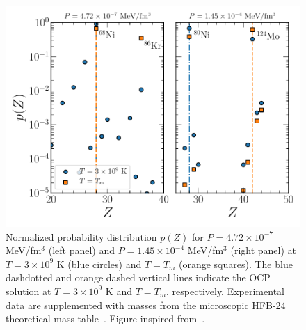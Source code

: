 \begin{figure}[!t]
  \begin{center}
    \includegraphics[width=0.9\linewidth]{figures/pj_ocrust.pdf}
  \end{center}
  \caption[Normalized probability distribution of the atomic number $Z$ for
  different thermodynamic conditions]{Normalized probability distribution 
    $p(Z)$ for $P=4.72\times 10^{-7}$ MeV/fm$^3$ (left panel) and $P=1.45\times 
    10^{-4}$ MeV/fm$^3$ (right panel) at $T=3\times 10^9$ K (blue circles) and 
    $T=T_m$ (orange squares). The blue dashdotted and orange dashed vertical 
    lines indicate the OCP solution at $T=3\times 10^9$ K and $T=T_m$,
    respectively.
    Experimental data are supplemented with masses from the microscopic 
    HFB-24 theoretical mass table~\cite{Goriely2013}. 
    Figure inspired from~\cite{Fantina2020}.}\label{fig:pj_ocrust}
\end{figure}

